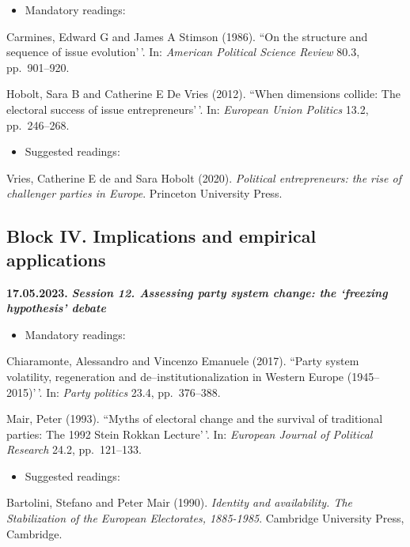 \documentclass[
  12pt,
]{article}
\providecommand{\tightlist}{%
  \setlength{\itemsep}{0pt}\setlength{\parskip}{0pt}}
\begin{document}
\begin{itemize}
\tightlist
\item
  Mandatory readings:
\end{itemize}

Carmines, Edward G and James A Stimson (1986). ``On the structure and
sequence of issue evolution'\,'. In:
\emph{American Political Science Review} 80.3, pp.~901--920.

Hobolt, Sara B and Catherine E De Vries (2012). ``When dimensions
collide: The electoral success of issue entrepreneurs'\,'. In:
\emph{European Union Politics} 13.2, pp.~246--268.

\begin{itemize}
\tightlist
\item
  Suggested readings:
\end{itemize}

Vries, Catherine E de and Sara Hobolt (2020).
\emph{Political entrepreneurs: the rise of challenger parties in Europe}.
Princeton University Press.

\hypertarget{block-iv.-implications-and-empirical-applications}{%
\subsection{Block IV. Implications and empirical
applications}\label{block-iv.-implications-and-empirical-applications}}

\textbf{17.05.2023.} \textbf{\emph{Session 12. Assessing party system
change: the `freezing hypothesis' debate}}

\begin{itemize}
\tightlist
\item
  Mandatory readings:
\end{itemize}

Chiaramonte, Alessandro and Vincenzo Emanuele (2017). ``Party system
volatility, regeneration and de--institutionalization in Western Europe
(1945--2015)'\,'. In: \emph{Party politics} 23.4, pp.~376--388.

Mair, Peter (1993). ``Myths of electoral change and the survival of
traditional parties: The 1992 Stein Rokkan Lecture'\,'. In:
\emph{European Journal of Political Research} 24.2, pp.~121--133.

\begin{itemize}
\tightlist
\item
  Suggested readings:
\end{itemize}

Bartolini, Stefano and Peter Mair (1990).
\emph{Identity and availability. The Stabilization of the European Electorates, 1885-1985}.
Cambridge University Press, Cambridge.
\end{document}
